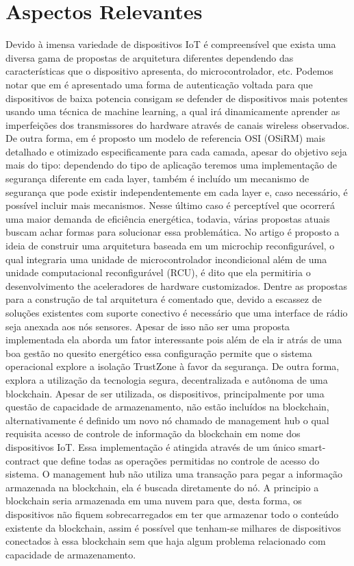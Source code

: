 \documentclass[article]{abntex2}
\begin{document}
\section{Aspectos Relevantes}
Devido à imensa variedade de dispositivos IoT é compreensível que exista uma diversa gama de propostas de arquitetura diferentes dependendo das características que o dispositivo apresenta, do microcontrolador, etc. Podemos notar que em \cite{Das:2018} é apresentado uma forma de autenticação voltada para que dispositivos de baixa potencia consigam se defender de dispositivos mais potentes usando uma técnica de machine learning, a qual irá dinamicamente aprender as imperfeições dos transmissores do hardware através de canais wireless observados. De outra forma, em \cite{Minoli:2017} é proposto um modelo de referencia OSI (OSiRM) mais detalhado e otimizado especificamente para cada camada, apesar do objetivo seja mais do tipo: dependendo do tipo de aplicação teremos uma implementação de segurança diferente em cada layer, também é incluído um mecanismo de segurança que pode existir independentemente em cada layer e, caso necessário, é possível incluir mais mecanismos. Nesse último caso é perceptível que ocorrerá uma maior demanda de eficiência energética, todavia, várias propostas atuais buscam achar formas para solucionar essa problemática.
\newline
No artigo \cite{Oliveira:2018} é proposto a ideia de construir uma arquitetura baseada em um microchip reconfigurável, o qual integraria uma unidade de microcontrolador incondicional além de uma unidade computacional reconfigurável (RCU), é dito que ela permitiria o desenvolvimento the aceleradores de hardware customizados. Dentre as propostas para a construção de tal arquitetura é comentado que, devido a escassez de soluções existentes com suporte conectivo é necessário que uma interface de rádio seja anexada aos nós sensores. Apesar de isso não ser uma proposta implementada ela aborda um fator interessante pois além de ela ir atrás de uma boa gestão no quesito energético essa configuração permite que o sistema operacional explore a isolação TrustZone à favor da segurança. De outra forma, \cite{Novo:2018} explora a utilização da tecnologia segura, decentralizada e autônoma de uma blockchain. Apesar de ser utilizada, os dispositivos, principalmente por uma questão de capacidade de armazenamento, não estão incluídos na blockchain, alternativamente é definido um novo nó chamado de management hub o qual requisita acesso de controle de informação da blockchain em nome dos dispositivos IoT. Essa implementação é atingida através de um único smart-contract que define todas as operações permitidas no controle de acesso do sistema. O management hub não utiliza uma transação para pegar a informação armazenada na blockchain, ela é buscada diretamente do nó. A principio a blockchain seria armazenada em uma nuvem para que, desta forma, os dispositivos não fiquem sobrecarregados em ter que armazenar todo o conteúdo existente da blockchain, assim é possível que tenham-se milhares de dispositivos conectados à essa blockchain sem que haja algum problema relacionado com capacidade de armazenamento.
\end{document}
